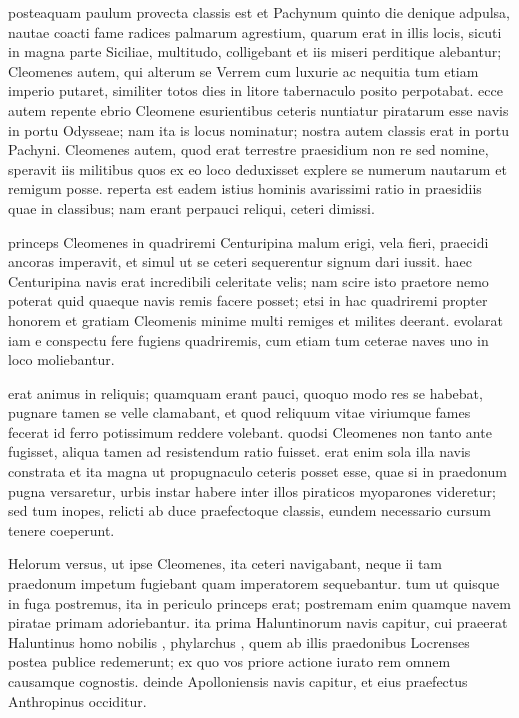  posteaquam paulum provecta classis est et Pachynum quinto die denique adpulsa, nautae coacti fame radices palmarum agrestium, quarum erat in illis locis, sicuti in magna parte Siciliae, multitudo, colligebant et iis miseri perditique alebantur; Cleomenes autem, qui alterum se Verrem cum luxurie ac nequitia tum etiam imperio putaret, similiter totos dies in litore tabernaculo posito perpotabat. ecce autem repente ebrio Cleomene esurientibus ceteris nuntiatur piratarum esse navis in portu Odysseae; nam ita is locus nominatur; nostra autem classis erat in portu Pachyni. Cleomenes autem, quod erat terrestre praesidium non re sed nomine, speravit iis militibus quos ex eo loco deduxisset explere se numerum nautarum et remigum posse. reperta est eadem istius hominis avarissimi ratio in praesidiis quae in classibus; nam erant perpauci reliqui, ceteri dimissi.

 princeps Cleomenes in quadriremi Centuripina malum erigi, vela fieri, praecidi ancoras imperavit, et simul ut se ceteri sequerentur signum dari iussit. haec Centuripina navis erat incredibili celeritate velis; nam scire isto praetore nemo poterat quid quaeque navis remis facere posset; etsi in hac quadriremi propter honorem et gratiam Cleomenis minime multi remiges et milites deerant. evolarat iam e conspectu fere fugiens quadriremis, cum etiam tum ceterae naves uno in loco moliebantur.

 erat animus in reliquis; quamquam erant pauci, quoquo modo res se habebat, pugnare tamen se velle clamabant, et quod reliquum vitae viriumque fames fecerat id ferro potissimum reddere volebant. quodsi Cleomenes non tanto ante fugisset, aliqua tamen ad resistendum ratio fuisset. erat enim sola illa navis constrata et ita magna ut propugnaculo ceteris posset esse, quae si in praedonum pugna versaretur, urbis instar habere inter illos piraticos myoparones videretur; sed tum inopes, relicti ab duce praefectoque classis, eundem necessario cursum tenere coeperunt.

 Helorum versus, ut ipse Cleomenes, ita ceteri navigabant, neque ii tam praedonum impetum fugiebant quam imperatorem sequebantur. tum ut quisque in fuga postremus, ita in periculo princeps erat; postremam enim quamque navem piratae primam adoriebantur. ita prima Haluntinorum navis capitur, cui praeerat Haluntinus homo nobilis , phylarchus , quem ab illis praedonibus Locrenses postea publice redemerunt; ex quo vos priore actione iurato rem omnem causamque cognostis. deinde Apolloniensis navis capitur, et eius praefectus Anthropinus occiditur.

